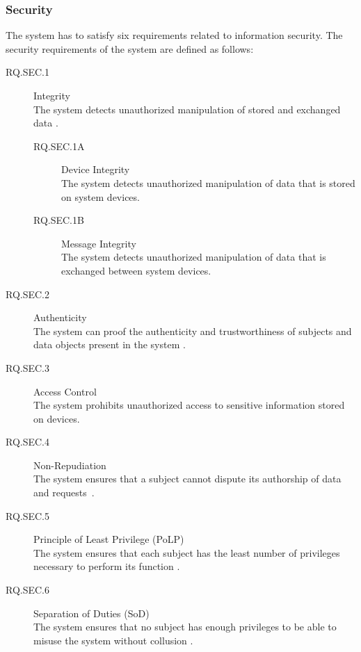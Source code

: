 \subsubsection{Security}
The system has to satisfy six requirements related to information security.
The security requirements of the system are defined as follows:
\begin{description}
    \item[RQ.SEC.1] Integrity\\
    The system detects unauthorized manipulation of stored and exchanged data \cite{Eckert2023}.
    \begin{description}
        \item[RQ.SEC.1A] Device Integrity\\
        The system detects unauthorized manipulation of data that is stored on system devices.
        \item[RQ.SEC.1B] Message Integrity\\
        The system detects unauthorized manipulation of data that is exchanged between system devices.
    \end{description}
    \item[RQ.SEC.2] Authenticity\\
    The system can proof the authenticity and trustworthiness of subjects and data objects present in the system \cite{Eckert2023}.
    \item[RQ.SEC.3] Access Control\\
    The system prohibits unauthorized access to sensitive information stored on devices.
    \item[RQ.SEC.4] Non-Repudiation\\
    The system ensures that a subject cannot dispute its authorship of data and requests~\cite{Eckert2023}.
    \item[RQ.SEC.5] Principle of Least Privilege  (PoLP)\\
    The system ensures that each subject has the least number of privileges necessary to perform its function \cite{JTF2020}.
    \item[RQ.SEC.6] Separation of Duties (SoD)\\
    The system ensures that no subject has enough privileges to be able to misuse the system without collusion \cite{JTF2020}.
\end{description}


